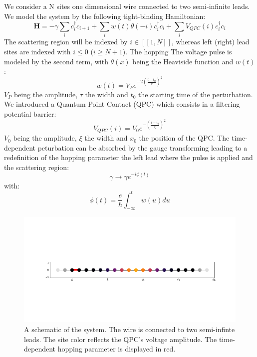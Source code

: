 We consider a N sites one dimensional wire connected to two semi-infinite leads. We model the system by the following tight-binding Hamiltonian:
\begin{equation}
\textbf{H} = -\gamma \sum_{i}c^{\dagger}_i c_{i+1} + \sum_{i} w(t)\theta(-i) c^{\dagger}_i c_{i} + \sum_{i} V_{QPC}(i) c^{\dagger}_i c_{i}
\end{equation}
The scattering region will be indexed by $i \in [\![1,N]\!]$, whereas left (right) lead sites are indexed with $i \leq 0$
 ($i \geq N+1$). The hopping  The voltage pulse is modeled by the second term, with $\theta(x)$ being the Heaviside function and $w(t)$:
 \begin{equation}
 	w(t) = V_P e^{-2(\frac{t-t_0}{\tau})^2}
 \end{equation}
 $V_P$ being the amplitude, $\tau$ the width and $t_0$ the starting time of the perturbation. We introduced a Quantum Point Contact (QPC) which consists in a filtering potential barrier:
 \begin{equation}
V_{QPC}(i) = V_0 e^{-(\frac{i - i_0}{\xi})^2}
 \end{equation}
 $V_0$ being the amplitude, $\xi$ the width and $x_0$ the position of the QPC.
 The time-dependent peturbation can be absorbed by the gauge transforming leading to a redefinition of the hopping parameter the left lead where the pulse is applied and the scattering region:
 \begin{equation}
\gamma \rightarrow \gamma e^{-i\phi(t)}
 \end{equation}
 with:
 \begin{equation}
 	\phi(t) = \frac{e}{\hbar}\int_{-\infty}^{t} w(u)du
 \end{equation}
 
\begin{figure}[h]
	\centering
	\includegraphics[width = 0.6\linewidth]{../figures/syst_color}
	\caption{A schematic of the system. The wire is connected to two semi-infinte leads. The site color reflects the QPC's voltage amplitude. The time-dependent hopping parameter is displayed in red. }
	\label{fig:systcolor}
\end{figure}